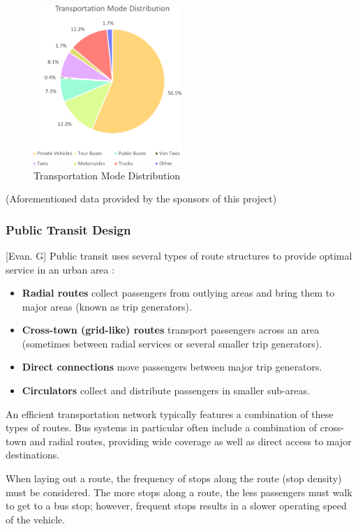 \documentclass[12pt]{article}                               %
\begin{document}
\begin{figure}[H]
    \centering
    \includegraphics[width=0.5\textwidth]{images/transportation_distribution.png}
    \caption{Transportation Mode Distribution}
    \label{img:transportation_modal_split}
\end{figure}

(Aforementioned data provided by the sponsors of this project)

\subsubsection{Public Transit Design}[Evan. G]
Public transit uses several types of route structures to provide optimal service in an urban area \cite{Fielbaum2016OptimalStructure, WikiBooksFundamentalsWorld}:
\begin{itemize}
    \item \textbf{Radial routes} collect passengers from outlying areas and bring them to major areas (known as trip generators).
    \item \textbf{Cross-town (grid-like) routes} transport passengers across an area (sometimes between radial services or several smaller trip generators).
    \item \textbf{Direct connections} move passengers between major trip generators.
    \item \textbf{Circulators} collect and distribute passengers in smaller sub-areas.
\end{itemize}

An efficient transportation network typically features a combination of these types of routes. Bus systems in particular often include a combination of cross-town and radial routes, providing wide coverage as well as direct access to major destinations.

When laying out a route, the frequency of stops along the route (stop density) must be considered. The more stops along a route, the less passengers must walk to get to a bus stop; however, frequent stops results in a slower operating speed of the vehicle.
\end{document}
